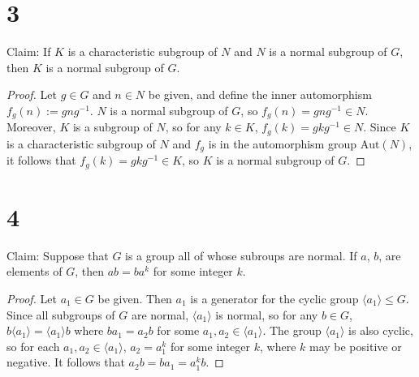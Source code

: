\documentclass{article}
\begin{document}
\section*{3}

Claim: If $K$ is a characteristic subgroup of $N$ and $N$ is a normal subgroup of $G$, then $K$ is a normal subgroup of 
$G$. 

\begin{proof}
    Let $g \in G$ and $n \in N$ be given, and define the inner automorphism $f_g(n) := gng^{-1}$.  $N$ is a normal subgroup of $G$, 
    so $f_g(n) = gng^{-1} \in N$.  Moreover, $K$ is a subgroup of $N$, so for any $k \in K$, $f_g(k) = gkg^{-1} \in N$.  Since $K$ is 
    a characteristic subgroup of $N$ and $f_g$ is in the automorphism group $\mathrm{Aut}(N)$, it follows that $f_g(k) = gkg^{-1} \in K$, so $K$ is a normal 
    subgroup of $G$.
\end{proof}

\section*{4} 

Claim: Suppose that $G$ is a group all of whose subroups are normal.  If $a$, $b$, are elements of $G$, then $ab = ba^k$ for 
some integer $k$.

\begin{proof}
    Let $a_1 \in G$ be given.  Then $a_1$ is a generator for the cyclic group $\langle a_1 \rangle  \leq G$.  Since all subgroups 
    of $G$ are normal, $\langle a_1 \rangle$ is normal, so for any $b \in G$, $b \langle a_1 \rangle = \langle a_1 \rangle b$ where $ba_1 = a_2b$ for some 
    $a_1, a_2 \in \langle a_1 \rangle$.  The group $\langle a_1 \rangle$ is also cyclic, so for each $a_1, a_2 \in \langle a_1 \rangle$, $a_2 = a_1 ^k$ for some 
    integer $k$, where $k$ may be positive or negative.  It follows that $a_2 b = ba_1 = a_1^k b$.
\end{proof}
\end{document}
